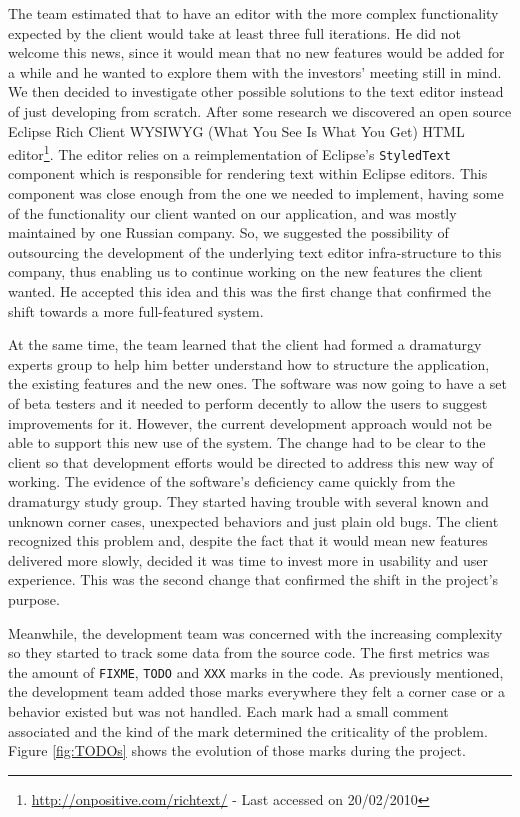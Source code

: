 \documentclass[lnbip]{svmultln}
\begin{document}
The team estimated that to have an editor with the more complex functionality
expected by the client would take at least three full iterations. He did not
welcome this news, since it would mean that no new features would be added for a
while and he wanted to explore them with the investors' meeting still in mind.
We then decided to investigate other possible solutions to the text editor
instead of just developing from scratch. After some research we discovered an
open source Eclipse Rich Client WYSIWYG (What You See Is What You Get) HTML
editor\footnote{\url{http://onpositive.com/richtext/} - Last accessed on
20/02/2010}. The editor relies on a reimplementation of Eclipse's
\texttt{StyledText} component which is responsible for rendering text within
Eclipse editors. This component was close enough from the one we needed to
implement, having some of the functionality our client wanted on our
application, and was mostly maintained by one Russian company. So, we suggested
the possibility of outsourcing the development of the underlying text editor
infra-structure to this company, thus enabling us to continue working on the new
features the client wanted. He accepted this idea and this was the first change
that confirmed the shift towards a more full-featured system.

At the same time, the team learned that the client had formed a dramaturgy
experts group to help him better understand how to structure the application,
the existing features and the new ones. The software was now going to have a set
of beta testers and it needed to perform decently to allow the users to suggest
improvements for it. However, the current development approach would not be able
to support this new use of the system. The change had to be clear to the client
so that development efforts would be directed to address this new way of
working. The evidence of the software's deficiency came quickly from the
dramaturgy study group. They started having trouble with several known and
unknown corner cases, unexpected behaviors and just plain old bugs. The client
recognized this problem and, despite the fact that it would mean new features
delivered more slowly, decided it was time to invest more in usability and user
experience. This was the second change that confirmed the shift in the project's
purpose.

Meanwhile, the development team was concerned with the increasing complexity so
they started to track some data from the source code. The first metrics was the
amount of \texttt{FIXME}, \texttt{TODO} and \texttt{XXX} marks in the code. As
previously mentioned, the development team added those marks everywhere they
felt a corner case or a behavior existed but was not handled. Each mark had a
small comment associated and the kind of the mark determined the criticality of
the problem. Figure \ref{fig:TODOs} shows the evolution of those marks during
the project.
\end{document}
